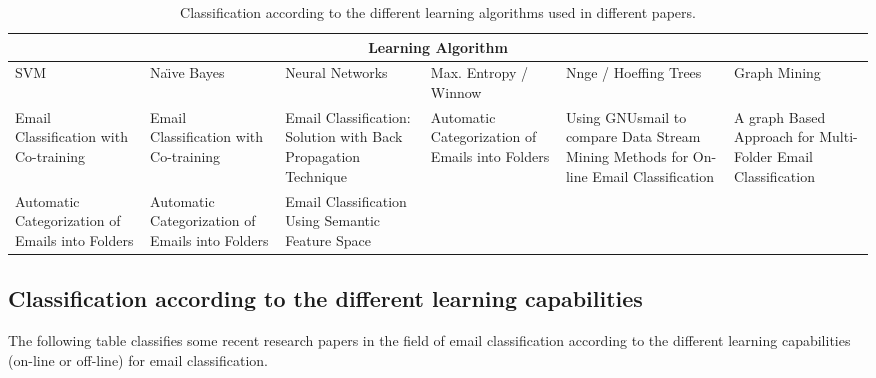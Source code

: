 \begin{center}
  \begin{table}[H]
    \begin{tabular}{|p{2cm}|p{2cm}|p{2cm}|p{2cm}|p{2cm}|p{2cm}|}
      \hline
      \multicolumn{6}{|c|}{Learning Algorithm} \\
      \hline
      SVM & Na\"{\i}ve Bayes & Neural Networks & Max. Entropy / Winnow & Nnge / Hoeffing Trees & Graph Mining \\ \hline
      Email Classification with Co-training \cite{SVETLANA01} &
      Email Classification with Co-training \cite{SVETLANA01} &
      Email Classification: Solution with Back Propagation Technique \cite{mous05} & 
      Automatic Categorization of Emails into Folders \cite{RON04} &
      Using GNUsmail to compare Data Stream Mining Methods for On-line Email Classification \cite{JOSE11} &
      A graph Based Approach for Multi-Folder Email Classification \cite{sift02} \\ \hline

      Automatic Categorization of Emails into Folders \cite{RON04} &
      Automatic Categorization of Emails into Folders \cite{RON04} &
      Email Classification Using Semantic Feature Space \cite{YUN08} & 
      &
      & \\ \hline
    \end{tabular}
    \caption{Classification according to the different learning algorithms used in different papers.}
  \end{table}
\end{center}

\subsection{Classification according to the different learning capabilities}
The following table classifies some recent research papers in the field of email 
classification according to the different learning capabilities (on-line or off-line) 
for email classification.

